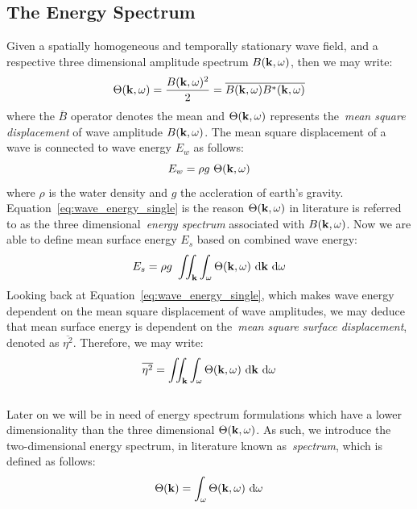 \subsection{The Energy Spectrum}
\label{sec:energy_spectrum}
Given a spatially homogeneous and temporally stationary wave field, and a
respective three dimensional amplitude spectrum $B(\mathbf{k},\omega)$, then we
may write:
\begin{equation}
\label{eq:energy_spectrum_3d}
 \Theta(\mathbf{k}, \omega) = \frac{B(\mathbf{k}, \omega)^2}{2} = 
\overline{B(\mathbf{k}, \omega)B^{*}(\mathbf{k}, \omega)}
\end{equation}
where the $\overline{B}$ operator denotes the mean and
$\Theta(\mathbf{k},\omega)$ represents the~\emph{mean square displacement} of
wave amplitude $B(\mathbf{k},\omega)$. The mean square displacement of a wave
is connected to wave energy $E_w$ as follows:
%
\begin{equation}
\label{eq:wave_energy_single}
 E_w = \rho g~\Theta(\mathbf{k},\omega)
\end{equation}
%
where $\rho$ is the water density and $g$ the accleration of earth's gravity.
Equation~\ref{eq:wave_energy_single} is the reason $\Theta(\mathbf{k},\omega)$
in literature is referred to as the three dimensional~\emph{energy spectrum}
associated with $B(\mathbf{k},\omega)$. Now we are able to define mean surface
energy $E_s$ based on combined wave energy:
%
\begin{equation}
\label{eq:wave_energy_3d}
 E_s = \rho g~\iint_{\mathbf{k}}\int_{\omega}\Theta(\mathbf{k},\omega)
~\mathrm{d}\mathbf{k}~\mathrm{ d}\omega
\end{equation}
%
Looking back at Equation~\ref{eq:wave_energy_single}, which makes wave energy
dependent on the mean square displacement of wave amplitudes, we may deduce that
mean surface energy is dependent on the~\emph{mean square surface displacement},
denoted as $\overline{\eta^2}$. Therefore, we may write:
%
\begin{equation}
\label{eq:mean_square_eta}
\overline{\eta^2} = \iint_{\mathbf{k}}\int_{\omega}\Theta(\mathbf{k},\omega)
~\mathrm{d}\mathbf{k}~\mathrm{d}\omega
\end{equation}
%
\\
Later on we will be in need of energy spectrum formulations which have a lower
dimensionality than the three dimensional $\Theta(\mathbf{k},\omega)$. As such,
we introduce the two-dimensional energy spectrum, in literature known
as~\emph{\wavenumber spectrum}, which is defined as follows:
\begin{equation}
\label{eq:energy_spectrum_2d}
 \Theta(\mathbf{k}) = \int_{\omega} \Theta(\mathbf{k}, \omega)~\mathrm{d}\omega
\end{equation}
